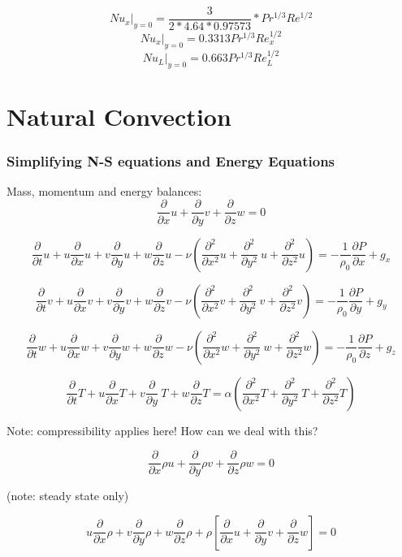\documentclass[11pt]{article}
\begin{document}
$$Nu_x |_{y=0} = \frac{3}{2 *4.64 *0.97573} * Pr^{1/3} Re^{1/2}$$
$$Nu_x |_{y=0} = 0.3313 Pr^{1/3} Re_x^{1/2}$$
$$Nu_L |_{y=0} = 0.663 Pr^{1/3} Re_L^{1/2}$$


\part{Natural Convection}

\section{Simplifying N-S equations and Energy Equations}

Mass, momentum and energy balances:
$$  \frac{\partial}{\partial x} u +  \frac{\partial}{\partial y} v +  \frac{\partial}{\partial z} w = 0$$


$$\frac{\partial }{\partial t} u + u \frac{\partial}{\partial x} u + v \frac{\partial}{\partial y} u + w \frac{\partial}{\partial z} u - \nu ( \frac{\partial^2}{\partial x^2} u + \frac{\partial^2}{\partial y^2} \ u + \frac{\partial^2}{\partial z^2} u) = - \frac{1}{\rho_0} \frac{\partial P}{\partial x} +g_x$$

$$\frac{\partial }{\partial t} v + u \frac{\partial}{\partial x} v + v \frac{\partial}{\partial y} v + w \frac{\partial}{\partial z} v - \nu ( \frac{\partial^2}{\partial x^2} v + \frac{\partial^2}{\partial y^2} \ v + \frac{\partial^2}{\partial z^2} v) = - \frac{1}{\rho_0} \frac{\partial P}{\partial y} +g_y$$

$$\frac{\partial }{\partial t} w + u \frac{\partial}{\partial x} w + v \frac{\partial}{\partial y} w + w \frac{\partial}{\partial z} w - \nu ( \frac{\partial^2}{\partial x^2} w + \frac{\partial^2}{\partial y^2} \ w + \frac{\partial^2}{\partial z^2} w) = - \frac{1}{\rho_0} \frac{\partial P}{\partial z} +g_z$$


$$\frac{\partial }{\partial t} T + u \frac{\partial}{\partial x} T + v \frac{\partial }{\partial y} \ T + w \frac{\partial }{\partial z} T  = \alpha ( \frac{\partial^2}{\partial x^2} T +  \frac{\partial^2 }{\partial y^2} \ T +  \frac{\partial^2 }{\partial z^2} T) $$ 


Note: compressibility applies here! How can we deal with this?

$$  \frac{\partial}{\partial x} \rho u +  \frac{\partial}{\partial y}  \rho v +  \frac{\partial}{\partial z} \rho w = 0$$

(note: steady state only)

$$u \frac{\partial}{\partial x} \rho  + v \frac{\partial}{\partial y}  \rho  +  w \frac{\partial}{\partial z} \rho   + \rho \left[ \frac{\partial}{\partial x} u +  \frac{\partial}{\partial y} v +  \frac{\partial}{\partial z} w \right] = 0$$
\end{document}
